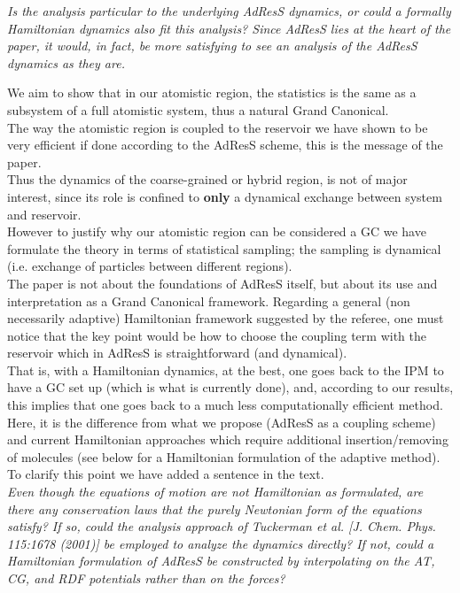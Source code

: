 \documentclass[12pt,a4paper]{article}
\begin{document}
{\color{teal} {\it Is the analysis particular to the underlying AdResS
dynamics, or could a formally Hamiltonian dynamics also fit this analysis? Since AdResS lies at the heart
of the paper, it would, in fact, be more satisfying to see an analysis of the AdResS dynamics as they are.}}

We aim to show that in our atomistic region, the statistics is the same as a subsystem of a full atomistic system, thus a natural Grand Canonical.\\
The way the atomistic region is coupled to the reservoir we have shown to be very efficient if done according to the AdResS scheme, this is the message of the paper.\\
Thus the dynamics of the coarse-grained or hybrid region, is not of major interest, since its role is confined to {\bf only} a dynamical exchange between system and reservoir.\\
However to justify why our atomistic region can be considered a GC we have formulate the theory in terms of statistical sampling; the sampling is dynamical (i.e. exchange of particles between different regions).\\
The paper is not about the foundations of AdResS itself, but about its use and interpretation as a Grand Canonical framework. Regarding a general (non necessarily adaptive) Hamiltonian framework suggested by the referee, one must notice that the key point would be how to choose the coupling term with the reservoir which in AdResS is straightforward (and dynamical).\\
That is, with a Hamiltonian dynamics, at the best, one goes back to the {IPM} to have a GC set up (which is what is currently done), and, according to our results, this implies that one goes back to a much less computationally efficient method. Here, it is the difference from what we propose (AdResS as a coupling scheme) and current Hamiltonian approaches which require additional insertion/removing of molecules (see below for a Hamiltonian formulation of the adaptive method).\\
To clarify this point we have added a sentence in the text.\\

{\color{teal} {\it Even though the equations of motion are not Hamiltonian as formulated, are there any conservation laws
that the purely Newtonian form of the equations satisfy? If so, could the analysis approach of Tuckerman
et al. [J. Chem. Phys. 115:1678 (2001)] be employed to analyze the dynamics directly? If not, could a
Hamiltonian formulation of AdResS be constructed by interpolating on the AT, CG, and RDF potentials
rather than on the forces?}}\\
\end{document}
